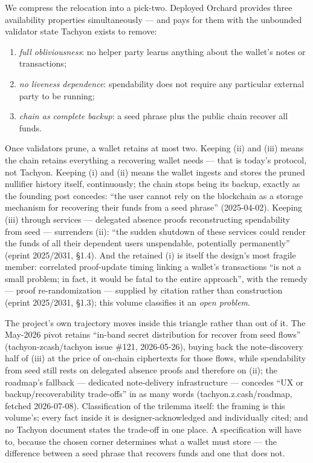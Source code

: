 \documentclass[11pt,a4paper]{article}
\theoremstyle{definition}
\begin{document}
We compress the relocation into a pick-two. Deployed Orchard provides three
availability properties simultaneously --- and pays for them with the
unbounded validator state Tachyon exists to remove:
\begin{enumerate}[label=(\roman*)]
\item \emph{full obliviousness}: no helper party learns anything about the
  wallet's notes or transactions;
\item \emph{no liveness dependence}: spendability does not require any
  particular external party to be running;
\item \emph{chain as complete backup}: a seed phrase plus the public chain
  recover all funds.
\end{enumerate}
Once validators prune, a wallet retains at most two. Keeping (ii) and (iii)
means the chain retains everything a recovering wallet needs --- that is
today's protocol, not Tachyon. Keeping (i) and (ii) means the wallet
ingests and stores the pruned nullifier history itself, continuously; the
chain stops being its backup, exactly as the founding post concedes: ``the
user cannot rely on the blockchain as a storage mechanism for recovering
their funds from a seed phrase'' (2025-04-02). Keeping (iii) through
services --- delegated absence proofs reconstructing spendability from seed
--- surrenders (ii): ``the sudden shutdown of these services could render
the funds of all their dependent users unspendable, potentially
permanently'' (eprint 2025/2031, \S1.4). And the retained (i) is itself the
design's most fragile member: correlated proof-update timing linking a
wallet's transactions ``is not a small problem; in fact, it would be fatal
to the entire approach'', with the remedy --- proof re-randomization ---
supplied by citation rather than construction (eprint 2025/2031, \S1.3);
this volume classifies it an \emph{open problem}.

The project's own trajectory moves inside this triangle rather than out of
it. The May-2026 pivot retains ``in-band secret distribution for recover
from seed flows'' (tachyon-zcash/tachyon issue \#121, 2026-05-26), buying
back the note-discovery half of (iii) at the price of on-chain ciphertexts
for those flows, while spendability from seed still rests on delegated
absence proofs and therefore on (ii); the roadmap's fallback --- dedicated
note-delivery infrastructure --- concedes ``UX or backup/recoverability
trade-offs'' in as many words (tachyon.z.cash/roadmap, fetched 2026-07-08).
Classification of the trilemma itself: the framing is this volume's; every
fact inside it is designer-acknowledged and individually cited; and no
Tachyon document states the trade-off in one place. A specification will
have to, because the chosen corner determines what a wallet must store ---
the difference between a seed phrase that recovers funds and one that does
not.
\end{document}
